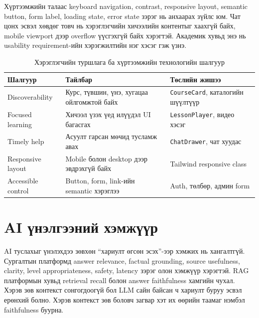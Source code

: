 Хүртээмжийн талаас keyboard navigation, contrast, responsive layout, semantic button, form label, loading state, error state зэрэг нь анхаарах зүйлс юм. Чат цонх эсвэл хөвдөг товч нь хэрэглэгчийн хичээлийн контентыг хаахгүй байх, mobile viewport дээр overflow үүсгэхгүй байх хэрэгтэй. Академик хувьд энэ нь usability requirement-ийн хэрэгжилтийн нэг хэсэг гэж үзнэ.

\begin{table}[htbp]
  \centering
  \begin{tabular}{|p{}|p{}|p{}|}
    \hline
    \textbf{Шалгуур} & \textbf{Тайлбар} & \textbf{Төслийн жишээ} \\ \hline
    Discoverability & Курс, түвшин, үнэ, хугацаа ойлгомжтой байх & \texttt{CourseCard}, каталогийн шүүлтүүр \\ \hline
    Focused learning & Хичээл үзэх үед илүүдэл UI багасгах & \texttt{LessonPlayer}, видео хэсэг \\ \hline
    Timely help & Асуулт гарсан мөчид тусламж авах & \texttt{ChatDrawer}, чат хуудас \\ \hline
    Responsive layout & Mobile болон desktop дээр эвдрэхгүй байх & Tailwind responsive class \\ \hline
    Accessible control & Button, form, link-ийн semantic хэрэглээ & Auth, төлбөр, админ form \\ \hline
  \end{tabular}
  \caption{Хэрэглэгчийн туршлага ба хүртээмжийн технологийн шалгуур}
  \label{tab:ux-accessibility-tech}
\end{table}

\section{AI үнэлгээний хэмжүүр}
AI туслахыг үнэлэхдээ зөвхөн “хариулт өгсөн эсэх”-ээр хэмжих нь хангалтгүй. Сургалтын платформд answer relevance, factual grounding, source usefulness, clarity, level appropriateness, safety, latency зэрэг олон хэмжүүр хэрэгтэй. RAG платформын хувьд retrieval recall болон answer faithfulness хамгийн чухал. Хэрэв зөв контекст сонгогдоогүй бол LLM сайн байсан ч хариулт буруу эсвэл ерөнхий болно. Хэрэв контекст зөв боловч загвар хэт их өөрийн таамаг нэмбэл faithfulness буурна.

